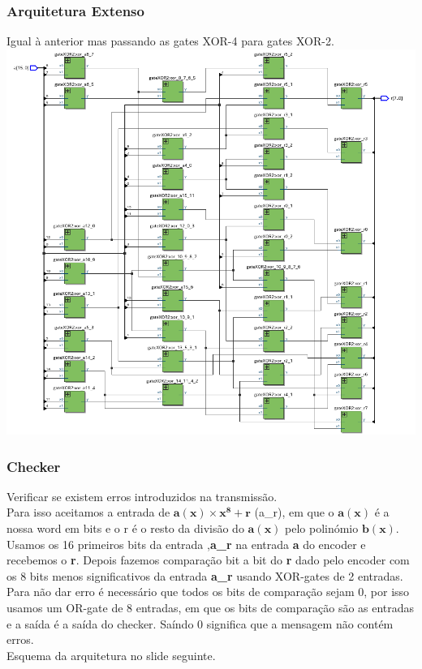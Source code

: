 \documentclass{beamer}
\begin{document}
\begin{frame}
\frametitle{Arquitetura Extenso}
    Igual à anterior mas passando as gates XOR-4 para gates XOR-2.
\includegraphics[scale=0.245]{arq_extenso.png}
\end{frame}

\begin{frame}
\frametitle{Checker}
    Verificar se existem erros introduzidos na transmissão.\\
    Para isso aceitamos a entrada de $\boldsymbol{a(x) \times x^8 + r}$ (a\_r), em que o $\boldsymbol{a(x)}$ é a nossa word em bits e o r é o resto da divisão do $\boldsymbol{a(x)}$ pelo polinómio $\boldsymbol{b(x)}$.\\
    Usamos os 16 primeiros bits da entrada ,\textbf{a\_r} na entrada \textbf{a} do encoder e recebemos o \textbf{r}. Depois fazemos comparação bit a bit do \textbf{r} dado pelo encoder com os 8 bits menos significativos da entrada \textbf{a\_r} usando XOR-gates de 2 entradas. Para não dar erro é necessário que todos os bits de comparação sejam 0, por isso usamos um OR-gate de 8 entradas, em que os bits de comparação são as entradas e a saída é a saída do checker. Saíndo 0 significa que a mensagem não contém erros.\\
    Esquema da arquitetura no slide seguinte.
\end{frame}
\end{document}
